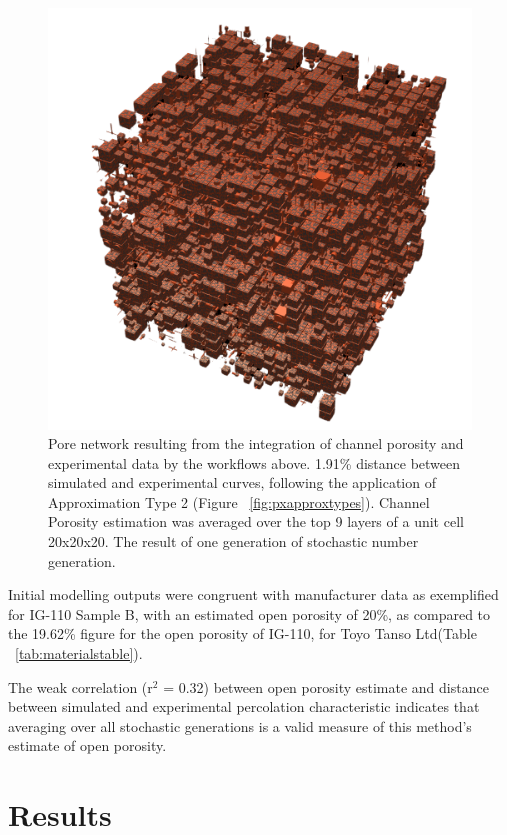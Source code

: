 \documentclass[review]{elsarticle}
\begin{document}
      \begin{figure}
        \centering
        \includegraphics[width=0.9\columnwidth]{./Media/unit cell no bg.png}
        \caption{Pore network resulting from the integration of channel porosity
        and experimental data by the workflows above. 1.91\% distance between
        simulated and experimental curves, following the application of
        Approximation Type 2 (Figure ~\ref{fig:pxapproxtypes}). Channel Porosity
        estimation was averaged over the top 9 layers of a unit cell 20x20x20.
        The result of one generation of stochastic number generation.}
        \label{fig:PX3dnetwork}
    \end{figure}

    Initial modelling outputs were congruent with manufacturer data as
    exemplified for IG-110 Sample B, with an estimated open porosity of 20\%, as
    compared to the 19.62\% figure for the open porosity of IG-110, for Toyo
    Tanso Ltd\texttrademark (Table ~\ref{tab:materialstable}).
    
    The weak correlation (r\(^2\) = 0.32) between open porosity estimate and
    distance between simulated and experimental percolation characteristic
    indicates that averaging over all stochastic generations is a valid measure
    of this method's estimate of open porosity. 

\section{Results}
\end{document}
